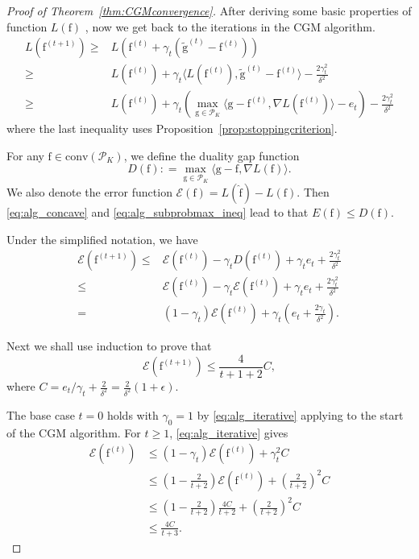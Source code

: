 \documentclass[11pt]{article}
\numberwithin{equation}{section}
\newcommand{\PS}{\mathcal{P}}
\newcommand{\fv}{\mathrm{f}}
\newcommand{\gv}{\mathrm{g}}
\begin{document}
\begin{appendices}
\begin{proof}[Proof of Theorem~\ref{thm:CGMconvergence}]
After deriving some basic properties of function $L(\fv)$ , now we get back to the iterations in the CGM algorithm.
\[
\begin{split}
L(\fv^{(t+1)}) \geq & L(\fv^{(t)} +\gamma_t (\tilde{\gv}^{(t)} - \fv^{(t)}))\\
\geq & L(\fv^{(t)}) + \gamma_t \langle L(\fv^{(t)}), \tilde{\gv}^{(t)} - \fv^{(t)}\rangle -   \frac{2\gamma_t^2}{\delta^2}\\
\geq & L(\fv^{(t)}) + \gamma_t (\max_{{\gv} \in \PS_K} \langle {\gv} - \fv^{(t)}, \nabla L(\fv^{(t)}) \rangle- e_t)  -   \frac{2\gamma_t^2}{\delta^2}
\end{split}
\]
where the last inequality uses Proposition~\ref{prop:stoppingcriterion}.

For any $\fv \in \mathrm{conv}(\PS_K)$, we define the duality gap function
\[
D(\fv): = \max_{\gv \in \PS_K} \langle \gv - \fv, \nabla L(\fv) \rangle.
\] 
We also denote the error function $\mathcal{E}(\fv)= L(\hat{\fv}) - L(\fv)$. Then \eqref{eq:alg_concave} and \eqref{eq:alg_subprobmax_ineq} lead to that $E(\fv) \leq D(\fv)$.

Under the simplified notation, we have 
\begin{equation}
\begin{split}
\mathcal{E}(\fv^{(t+1)}) \leq & \mathcal{E}(\fv^{(t)}) - \gamma_t D(\fv^{(t)}) +\gamma_t e_t + \frac{2 \gamma_t^2}{\delta^2} \\
\leq & \mathcal{E}(\fv^{(t)}) - \gamma_t \mathcal{E}(\fv^{(t)}) +\gamma_t e_t + \frac{2 \gamma_t^2}{\delta^2}\\
= & (1-\gamma_t) \mathcal{E}(\fv^{(t)}) + \gamma_t(e_t +  \frac{2\gamma_t}{\delta^2}).
\end{split}
\label{eq:alg_iterative}
\end{equation}

Next we shall use induction to prove that
\[
\mathcal{E}(\fv^{(t+1)}) \leq \frac{4}{t+1+2}C,
\]
where $C= e_t/\gamma_t +  \frac{2}{\delta^2} = \frac{2}{\delta^2}(1+\epsilon) $.

The base case $t=0$ holds with $\gamma_0 = 1$ by \eqref{eq:alg_iterative} applying to the start of the CGM algorithm. For $t\geq 1$, \eqref{eq:alg_iterative} gives
\[
\begin{split}
\mathcal{E}(\fv^{(t)}) & \leq (1-\gamma_t) \mathcal{E}(\fv^{(t)}) + \gamma_t^2 C\\
& \leq \left(1- \frac{2}{t+2} \right) \mathcal{E}(\fv^{(t)}) + \left( \frac{2}{t+2} \right)^2 C\\
&\leq \left( 1- \frac{2}{t+2}\right) \frac{4C}{t+2} + \left( \frac{2}{t+2} \right)^2C\\
& \leq \frac{4C}{t+3}.
\end{split}
\]
\end{proof}



\end{appendices}
\end{document}
